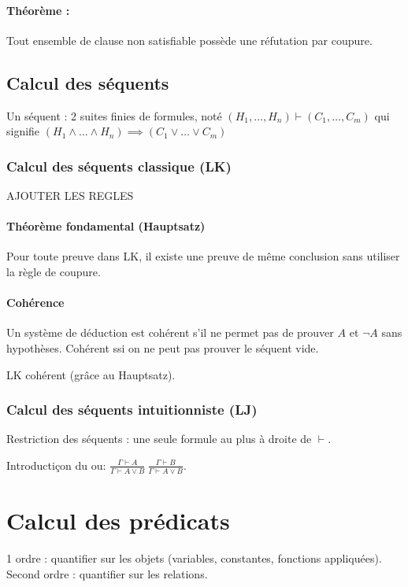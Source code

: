 \documentclass[french]{article}
\begin{document}
\paragraph{Théorème :} Tout ensemble de clause non satisfiable possède une réfutation par coupure.

\subsection{Calcul des séquents}
Un séquent : 2 suites finies de formules, noté  $(H_1,\dots , H_n)\vdash (C_1,\dots , C_m)$ qui signifie $(H_1\wedge\dots\wedge H_n)\implies (C_1\vee\dots\vee C_m)$

\subsubsection{Calcul des séquents classique (LK)}
AJOUTER LES REGLES

\paragraph{Théorème fondamental (Hauptsatz)}
Pour toute preuve dans LK, il existe une preuve de même conclusion sans utiliser la règle de coupure.

\paragraph{Cohérence} Un système de déduction est cohérent s'il ne permet pas de prouver $A$ et $\neg A$ sans hypothèses. Cohérent ssi on ne peut pas prouver le séquent vide.

LK cohérent (grâce au Hauptsatz).

\subsubsection{Calcul des séquents intuitionniste (LJ)}
Restriction des séquents : une seule formule au plus à droite de $\vdash$.

Introductiçon du ou:
$\frac{\Gamma\vdash A}{\Gamma\vdash A\vee B}\ \frac{\Gamma\vdash B}{\Gamma\vdash A\vee B}$.

\section{Calcul des prédicats}
1 ordre : quantifier sur les objets (variables, constantes, fonctions appliquées). Second ordre : quantifier sur les relations.
\end{document}
